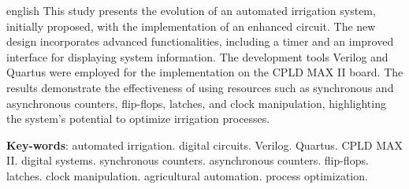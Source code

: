 \documentclass[
	article,			%
	11pt,				%
	oneside,			%
	a4paper,			%
	english,			%
	brazil,				%
	sumario=tradicional
	]{abntex2}
\begin{document}
\renewcommand{\resumoname}{Abstract}
\begin{resumoumacoluna}
 \begin{otherlanguage*}{english}
   This study presents the evolution of an automated irrigation system, initially proposed, with the implementation of an enhanced circuit. The new design incorporates advanced functionalities, including a timer and an improved interface for displaying system information. The development tools Verilog and Quartus were employed for the implementation on the CPLD MAX II board. The results demonstrate the effectiveness of using resources such as synchronous and asynchronous counters, flip-flops, latches, and clock manipulation, highlighting the system's potential to optimize irrigation processes.

   \vspace{\onelineskip}
 
   \noindent
   \textbf{Key-words}: automated irrigation. digital circuits. Verilog. Quartus. CPLD MAX II. digital systems. synchronous counters. asynchronous counters. flip-flops. latches. clock manipulation. agricultural automation. process optimization.






 \end{otherlanguage*}  
\end{resumoumacoluna}



\end{document}

